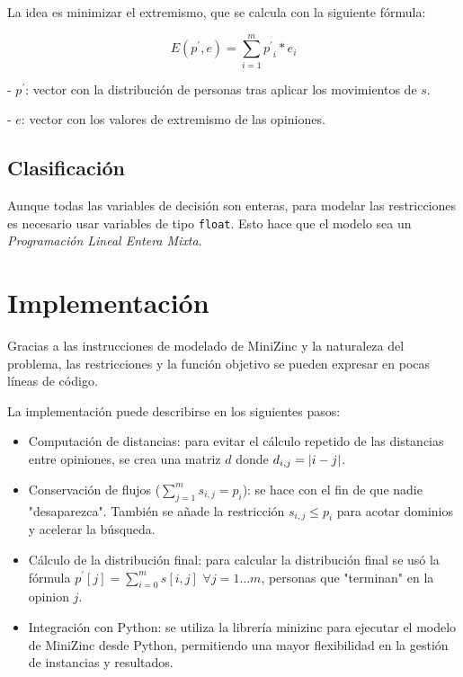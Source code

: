 La idea es minimizar el extremismo, que se calcula con la siguiente fórmula:

\begin{equation}
	E(p^\prime,e) = \sum_{ i = 1 }^m { p^\prime }_i * e_i
\end{equation}

- $p^\prime$: vector con la distribución de personas tras aplicar los movimientos de $s$.

- $e$: vector con los valores de extremismo de las opiniones.

\subsection{Clasificación}

Aunque todas las variables de decisión son enteras, para modelar las restricciones es necesario usar variables de tipo \texttt{float}. Esto hace que el modelo sea un \emph{Programación Lineal Entera Mixta}.

\section{Implementación}

Gracias a las instrucciones de modelado de MiniZinc y la naturaleza del problema, las restricciones y la función objetivo se pueden expresar en pocas líneas de código.

La implementación puede describirse en los siguientes pasos:

\begin{itemize}
	\item Computación de distancias: para evitar el cálculo repetido de las distancias entre opiniones, se crea una matriz $d$ donde $d_{ i,j } = \left \lvert  i - j  \right \rvert$.

	\item Conservación de flujos ($\sum_{ j = 1 }^m s_{ i,j } = p_i$): se hace con el fin de que nadie "desaparezca". También se añade la restricción $s_{ i,j } \leq p_i$ para acotar dominios y acelerar la búsqueda.

	\item Cálculo de la distribución final: para calcular la distribución final se usó la fórmula $p^\prime[j] = \sum_{ i = 0 }^m s[i,j]$ $\forall j = 1\dots m$, personas que "terminan" en la opinion $j$.

	\item Integración con Python: se utiliza la librería minizinc para ejecutar el modelo de MiniZinc desde Python, permitiendo una mayor flexibilidad en la gestión de instancias y resultados.
\end{itemize}

